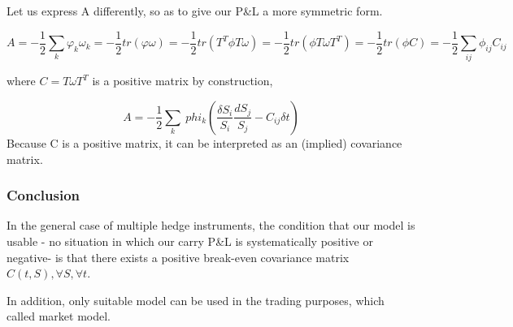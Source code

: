 \documentclass[a4]{article}
\begin{document}
Let us express A differently, so as to give our P\&L a more symmetric form.\par 
\begin{equation}
	A = -\frac{1}{2} \sum_{k}\varphi_{k}\omega_{k} = -\frac{1}{2}tr(\varphi \omega)=-\frac{1}{2}tr(T^{T}\phi T\omega )=-\frac{1}{2}tr(\phi T\omega T^{T})=-\frac{1}{2}tr(\phi C) = -\frac{1}{2}\sum_{ij}\phi_{ij}C_{ij}
\end{equation}\par 
where $C = T\omega T^{T}$ is a positive matrix by construction,\par 
\begin{equation}
A=-\frac{1}{2}\sum_{k}\
phi_{k}(\dfrac{\delta S_{i} }{S_{i}}\dfrac{dS_{j}}{S_{j}}-C_{ij}\delta t)
\end{equation}
Because C is a positive matrix, it can be interpreted as an (implied) covariance matrix.\par 
\subsubsection{Conclusion}
In the general case of multiple hedge instruments, the condition that our model is usable - no situation in which our carry P\&L is systematically positive or negative- is that there exists a positive break-even covariance matrix $ C(t,S),\forall S, \forall t$.\par 
In addition, only suitable model can be used in the trading purposes, which called market model.
\end{document}
